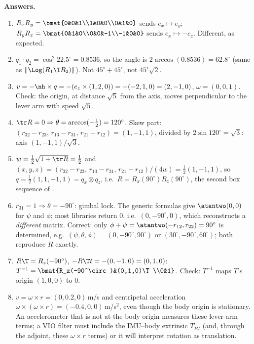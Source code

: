 \textbf{Answers.}
\begin{enumerate}[label=\textbf{P\arabic*.},itemsep=2pt]
\item $R_xR_y=\bmat{0&0&1\\1&0&0\\0&1&0}$ sends $e_x\mapsto e_y$; $R_yR_x=\bmat{0&1&0\\0&0&-1\\-1&0&0}$ sends $e_x\mapsto-e_z$. Different, as expected.
\item $q_1\cdot q_2=\cos^2 22.5^\circ=0.8536$, so the angle is $2\arccos(0.8536)=62.8^\circ$ (same as $\|\Log(R_1\T R_2)\|$). Not $45^\circ+45^\circ$, not $45^\circ\sqrt2$.
\item $v=-\nh\times q=-(e_z\times(1,2,0))=-(-2,1,0)=(2,-1,0)$, $\omega=(0,0,1)$. Check: the origin, at distance $\sqrt5$ from the axis, moves perpendicular to the lever arm with speed $\sqrt5$.
\item $\tr R=0\Rightarrow\theta=\arccos(-\tfrac12)=120^\circ$. Skew part: $(r_{32}-r_{23},\,r_{13}-r_{31},\,r_{21}-r_{12})=(1,-1,1)$, divided by $2\sin120^\circ=\sqrt3$: axis $(1,-1,1)/\sqrt3$.
\item $w=\tfrac12\sqrt{1+\tr R}=\tfrac12$ and $(x,y,z)=(r_{32}-r_{23},\,r_{13}-r_{31},\,r_{21}-r_{12})/(4w)=\tfrac12(1,-1,1)$, so $q=\tfrac12(1,1,-1,1)=q_x\otimes q_z$, i.e.\ $R=R_x(90^\circ)R_z(90^\circ)$, the second box sequence of .
\item $r_{31}=1\Rightarrow\theta=-90^\circ$: gimbal lock. The generic formulas give $\atantwo(0,0)$ for $\psi$ and $\phi$; most libraries return $0$, i.e.\ $(0,-90^\circ,0)$, which reconstructs a \emph{different} matrix. Correct: only $\phi+\psi=\atantwo(-r_{12},r_{22})=90^\circ$ is determined, e.g.\ $(\psi,\theta,\phi)=(0,-90^\circ,90^\circ)$ or $(30^\circ,-90^\circ,60^\circ)$; both reproduce $R$ exactly.
\item $R\T=R_z(-90^\circ)$, $-R\T t=-(0,-1,0)=(0,1,0)$: $T^{-1}=\bmat{R_z(-90^\circ)&(0,1,0)\T\\0&1}$. Check: $T^{-1}$ maps $T$'s origin $(1,0,0)$ to $0$.
\item $v=\omega\times r=(0,0.2,0)$\,m/s and centripetal acceleration $\omega\times(\omega\times r)=(-0.4,0,0)$\,m/s$^2$, even though the body origin is stationary. An accelerometer that is not at the body origin measures these lever-arm terms; a VIO filter must include the IMU--body extrinsic $T_{BI}$ (and, through the adjoint, these $\omega\times r$ terms) or it will interpret rotation as translation.
\end{enumerate}

